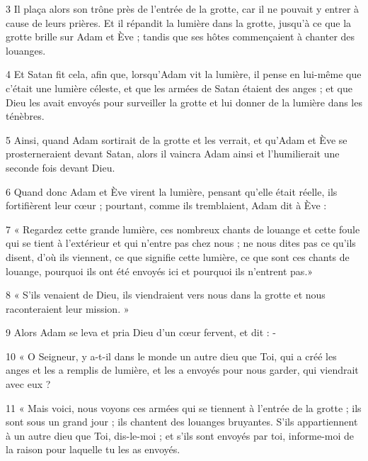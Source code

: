 \par 3 Il plaça alors son trône près de l'entrée de la grotte, car il ne pouvait y entrer à cause de leurs prières. Et il répandit la lumière dans la grotte, jusqu'à ce que la grotte brille sur Adam et Ève ; tandis que ses hôtes commençaient à chanter des louanges.

\par 4 Et Satan fit cela, afin que, lorsqu'Adam vit la lumière, il pense en lui-même que c'était une lumière céleste, et que les armées de Satan étaient des anges ; et que Dieu les avait envoyés pour surveiller la grotte et lui donner de la lumière dans les ténèbres.

\par 5 Ainsi, quand Adam sortirait de la grotte et les verrait, et qu'Adam et Ève se prosterneraient devant Satan, alors il vaincra Adam ainsi et l'humilierait une seconde fois devant Dieu.

\par 6 Quand donc Adam et Ève virent la lumière, pensant qu'elle était réelle, ils fortifièrent leur cœur ; pourtant, comme ils tremblaient, Adam dit à Ève :

\par 7 « Regardez cette grande lumière, ces nombreux chants de louange et cette foule qui se tient à l'extérieur et qui n'entre pas chez nous ; ne nous dites pas ce qu'ils disent, d'où ils viennent, ce que signifie cette lumière, ce que sont ces chants de louange, pourquoi ils ont été envoyés ici et pourquoi ils n'entrent pas.»

\par 8 « S'ils venaient de Dieu, ils viendraient vers nous dans la grotte et nous raconteraient leur mission. »

\par 9 Alors Adam se leva et pria Dieu d'un cœur fervent, et dit : -

\par 10 « O Seigneur, y a-t-il dans le monde un autre dieu que Toi, qui a créé les anges et les a remplis de lumière, et les a envoyés pour nous garder, qui viendrait avec eux ?

\par 11 « Mais voici, nous voyons ces armées qui se tiennent à l'entrée de la grotte ; ils sont sous un grand jour ; ils chantent des louanges bruyantes. S'ils appartiennent à un autre dieu que Toi, dis-le-moi ; et s'ils sont envoyés par toi, informe-moi de la raison pour laquelle tu les as envoyés.

